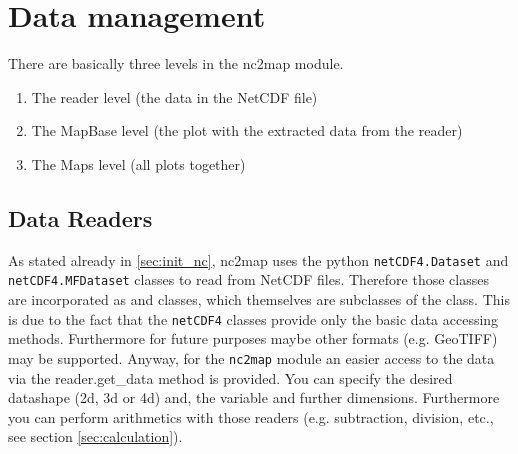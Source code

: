 \chapter{Data management} \label{ch:data}
There are basically three levels in the \gls{nc2map} module.
\begin{enumerate}
	\item The \gls{reader} level (the data in the NetCDF file)
	\item The \gls{MapBase} level (the plot with the extracted data from the \gls{reader})
	\item The \gls{Maps} level (all plots together)
\end{enumerate}

\section{Data Readers} \label{sec:readers}
As stated already in \autoref{sec:init_nc}, \gls{nc2map} uses the python \lstinline|netCDF4.Dataset| and \lstinline|netCDF4.MFDataset| classes to read from NetCDF files. Therefore those classes are incorporated as  and  classes, which themselves are subclasses of the  class. This is due to the fact that the \lstinline|netCDF4| classes provide only the basic data accessing methods. Furthermore for future purposes maybe other formats (e.g. GeoTIFF) may be supported. Anyway, for the \lstinline|nc2map| module an easier access to the data via the \gls{reader.get_data} method is provided. You can specify the desired datashape (2d, 3d or 4d) and, the variable and further dimensions. Furthermore you can perform arithmetics with those readers (e.g. subtraction, division, etc., see section \ref{sec:calculation}).

